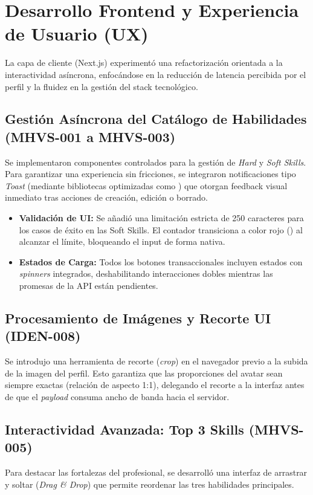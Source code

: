 \section{Desarrollo Frontend y Experiencia de Usuario (UX)}
\label{sec:frontend_sprint2}

La capa de cliente (Next.js) experimentó una refactorización orientada a la interactividad asíncrona, enfocándose en la reducción de latencia percibida por el perfil y la fluidez en la gestión del stack tecnológico.

\subsection{Gestión Asíncrona del Catálogo de Habilidades (MHVS-001 a MHVS-003)}
Se implementaron componentes controlados para la gestión de \textit{Hard} y \textit{Soft Skills}. Para garantizar una experiencia sin fricciones, se integraron notificaciones tipo \textit{Toast} (mediante bibliotecas optimizadas como ) que otorgan feedback visual inmediato tras acciones de creación, edición o borrado.

\begin{itemize}[noitemsep]
    \item \textbf{Validación de UI:} Se añadió una limitación estricta de 250 caracteres para los casos de éxito en las Soft Skills. El contador transiciona a color rojo () al alcanzar el límite, bloqueando el input de forma nativa.
    \item \textbf{Estados de Carga:} Todos los botones transaccionales incluyen estados  con \textit{spinners} integrados, deshabilitando interacciones dobles mientras las promesas de la API están pendientes.
\end{itemize}

\subsection{Procesamiento de Imágenes y Recorte UI (IDEN-008)}
Se introdujo una herramienta de recorte (\textit{crop}) en el navegador previo a la subida de la imagen del perfil. Esto garantiza que las proporciones del avatar sean siempre exactas (relación de aspecto 1:1), delegando el recorte a la interfaz antes de que el \textit{payload} consuma ancho de banda hacia el servidor.

\subsection{Interactividad Avanzada: Top 3 Skills (MHVS-005)}
Para destacar las fortalezas del profesional, se desarrolló una interfaz de arrastrar y soltar (\textit{Drag \& Drop}) que permite reordenar las tres habilidades principales. 

